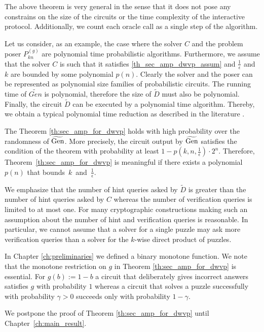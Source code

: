 The above theorem is very general in the sense that it does not pose any constrains
on the size of the circuits or the time complexity of the interactive protocol.
Additionally, we count each oracle call as a single step of the algorithm.

Let us consider, as an example, the case where the solver $C$ and the problem poser $P_{kn}^{(g)}$ are polynomial time probabilistic algorithms.
Furthermore, we assume that the solver $C$ is such that it satisfies \eqref{th_sec_amp_dwvp_assum}
and $\frac{1}{\epsilon}$ and $k$ are bounded by some polynomial $p(n)$.
Clearly the solver and the poser can be represented as polynomial size families of probabilistic circuits.
The running time of $\widetilde{Gen}$ is polynomial, therefore the size of $\widetilde{D}$ must also be polynomial.
Finally, the circuit $\widetilde{D}$ can be executed by a polynomial time algorithm.
Thereby, we obtain a typical polynomial time reduction as described in the literature \cite{Arora:2009:CCM:1540612, LectureNotesCrypo}.

The Theorem \ref{th:sec_amp_for_dwvp} holds with high probability over the randomness of $\widetilde{\operatorname{\text{Gen}}}$.
More precisely, the circuit output by $\widetilde{\operatorname{\text{Gen}}}$ satisfies the condition of the theorem with probability
at least $1 - p(k, n, \frac{1}{\epsilon}) \cdot 2^n$. Therefore, Theorem~\ref{th:sec_amp_for_dwvp} is meaningful if there exists a polynomial $p(n)$
that bounds~$k$~and~$\frac{1}{\epsilon}$.

We emphasize that the number of hint queries asked by $\widetilde{D}$ is greater than the number of hint queries asked by $C$ whereas the number of verification queries
is limited to at most one. For many cryptographic constructions making such an assumption about the number of hint and verification queries is reasonable.
In particular, we cannot assume that a solver for a single puzzle may ask more verification queries than a solver for the $k$-wise direct product of puzzles.

In Chapter \ref{ch:preliminaries} we defined a binary monotone function.
We note that the monotone restriction on $g$ in Theorem \ref{th:sec_amp_for_dwvp} is essential. For $g(b) := 1 - b$ a circuit that deliberately gives incorrect
answers satisfies $g$ with probability $1$ whereas a circuit that solves a puzzle successfully with probability
$\gamma > 0$ succeeds only with probability $1 - \gamma$.

We postpone the proof of Theorem \ref{th:sec_amp_for_dwvp} until Chapter~\ref{ch:main_result}.

